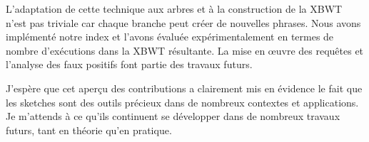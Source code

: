 L'adaptation de cette technique aux arbres et à la construction de la XBWT n'est pas triviale car chaque branche peut créer de nouvelles phrases. Nous avons implémenté notre index et l'avons évaluée expérimentalement en termes de nombre d'exécutions dans la XBWT résultante. La mise en œuvre des requêtes et l'analyse des faux positifs font partie des travaux futurs.

J'espère que cet aperçu des contributions a clairement mis en évidence le fait que les sketches sont des outils précieux dans de nombreux contextes et applications. Je m'attends à ce qu'ils continuent se développer dans de nombreux travaux futurs, tant en théorie qu'en pratique.